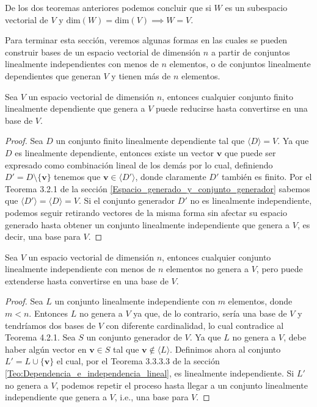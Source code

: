 \documentclass[12pt]{article}
\newenvironment{teorema}[2][Teorema]{\begin{trivlist}
\item[\hskip \labelsep {\bfseries #1}\hskip \labelsep {\bfseries #2.}]}{\end{trivlist}}
\newenvironment{corolario}[2][Corolario]{\begin{trivlist}
\item[\hskip \labelsep {\bfseries #1}]}{\end{trivlist}}
\begin{document}
\begin{corolario}{4.2}
    De los dos teoremas anteriores podemos concluir que si $W$ es un subespacio vectorial de $V$ y $\text{dim}(W)=\text{dim}(V)\implies W=V.$
\end{corolario}

Para terminar esta sección, veremos algunas formas en las cuales se pueden construir bases de un espacio vectorial de dimensión $n$ a partir de conjuntos linealmente independientes con menos de $n$ elementos, o de conjuntos linealmente dependientes que generan $V$ y tienen más de $n$ elementos.

\begin{teorema} {4.2.4}
    Sea $V$ un espacio vectorial de dimensión $n$, entonces cualquier conjunto finito linealmente dependiente que genera a $V$ puede reducirse hasta convertirse en una base de $V$.

\begin{proof}
    Sea $D$ un conjunto finito linealmente dependiente tal que $\langle D \rangle =V$. Ya que $D$ es linealmente dependiente, entonces existe un vector $\mathbf{v}$ que puede ser expresado como combinación lineal de los demás por lo cual, definiendo $D'=D\setminus\{\mathbf{v}\}$ tenemos que $\mathbf{v}\in\langle D' \rangle$, donde claramente $D'$ también es finito. Por el Teorema 3.2.1 de la sección \ref{Espacio_generado_y_conjunto_generador} sabemos que $\langle D' \rangle =\langle D \rangle =V$. Si el conjunto generador $D'$ no es linealmente independiente, podemos seguir retirando vectores de la misma forma sin afectar su espacio generado hasta obtener un conjunto linealmente independiente que genera a $V$, es decir, una base para $V$.
\end{proof}

\end{teorema}

\begin{teorema} {4.2.5}
Sea $V$ un espacio vectorial de dimensión $n$, entonces cualquier conjunto linealmente independiente con menos de $n$ elementos no genera a $V$, pero puede extenderse hasta convertirse en una base de $V$.

\begin{proof}
Sea $L$ un conjunto linealmente independiente con $m$ elementos, donde $m<n$. Entonces $L$ no genera a $V$ ya que, de lo contrario, sería una base de $V$ y tendríamos dos bases de $V$ con diferente cardinalidad, lo cual contradice al Teorema 4.2.1. Sea $S$ un conjunto generador de $V$. Ya que $L$ no genera a $V$, debe haber algún vector en $\mathbf{v}\in S$ tal que $\mathbf{v}\notin \langle L \rangle$. Definimos ahora al conjunto $L'=L\cup \{\mathbf{v}\}$ el cual, por el Teorema 3.3.3.3 de la sección \ref{Teo:Dependencia_e_independencia_lineal}, es linealmente independiente. Si $L'$ no genera a $V$, podemos repetir el proceso hasta llegar a un conjunto linealmente independiente que genera a $V$, i.e., una base para $V$.
\end{proof}

\end{teorema}
\end{document}
